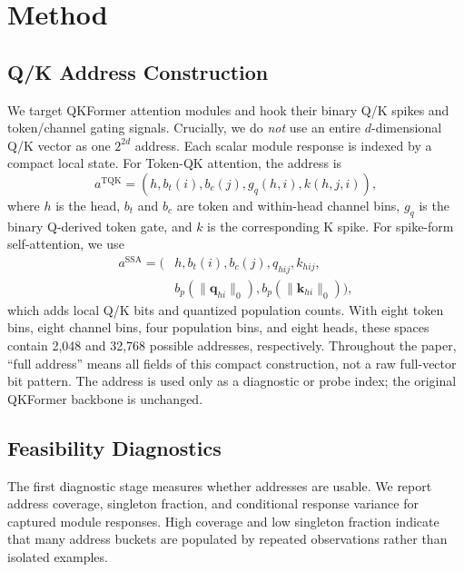 \section{Method}
\label{sec:method}

\subsection{Q/K Address Construction}
\label{sec:qk_address}

We target QKFormer attention modules and hook their binary Q/K spikes and
token/channel gating signals. Crucially, we do \emph{not} use an entire
$d$-dimensional Q/K vector as one $2^{2d}$ address. Each scalar module response
is indexed by a compact local state. For Token-QK attention, the address is
\begin{equation}
 a^{\mathrm{TQK}}=(h,b_t(i),b_c(j),g_q(h,i),k(h,j,i)),
\end{equation}
where $h$ is the head, $b_t$ and $b_c$ are token and within-head channel bins,
$g_q$ is the binary Q-derived token gate, and $k$ is the corresponding K spike.
For spike-form self-attention, we use
\begin{equation}
\begin{aligned}
 a^{\mathrm{SSA}}=(&h,b_t(i),b_c(j),q_{hij},k_{hij},\\
 &b_p(\lVert\mathbf q_{hi}\rVert_0),
 b_p(\lVert\mathbf k_{hi}\rVert_0)),
\end{aligned}
\end{equation}
which adds local Q/K bits and quantized population counts. With eight token
bins, eight channel bins, four population bins, and eight heads, these spaces
contain 2,048 and 32,768 possible addresses, respectively. Throughout the
paper, ``full address'' means all fields of this compact construction, not a
raw full-vector bit pattern. The address is used only as a diagnostic or probe
index; the original QKFormer backbone is unchanged.

\subsection{Feasibility Diagnostics}
\label{sec:e0e1}

The first diagnostic stage measures whether addresses are usable. We report
address coverage, singleton fraction, and conditional response variance for
captured module responses. High coverage and low singleton fraction indicate
that many address buckets are populated by repeated observations rather than
isolated examples.

